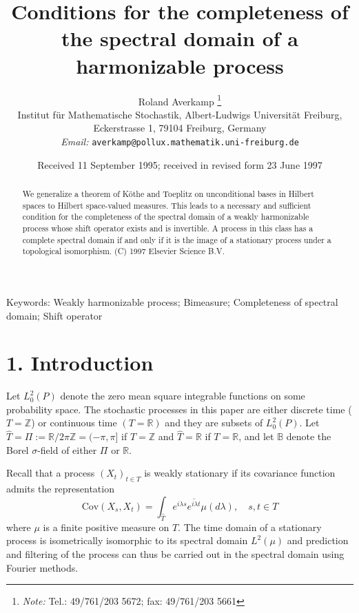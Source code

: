 \documentclass{article}
\newcommand{\assign}{:=}
\newcommand{\tmaffiliation}[1]{\\ #1}
\newcommand{\tmemail}[1]{\\ \textit{Email:} \texttt{#1}}
\newcommand{\tmnote}[1]{\thanks{\textit{Note:} #1}}
\begin{document}
\title{Conditions for the completeness of the spectral domain of a
harmonizable process}

\author{
  Roland Averkamp
  \tmnote{Tel.: 49/761/203 5672; fax: 49/761/203 5661}
  \tmaffiliation{Institut f{\"u}r Mathematische Stochastik, Albert-Ludwigs
  Universit{\"a}t Freiburg, Eckerstrasse 1, 79104 Freiburg, Germany}
  \tmemail{averkamp@pollux.mathematik.uni-freiburg.de}
}

\date{Received 11 September 1995; received in revised form 23 June 1997}

\maketitle

\begin{abstract}
  We generalize a theorem of K{\"o}the and Toeplitz on unconditional bases in
  Hilbert spaces to Hilbert space-valued measures. This leads to a necessary
  and sufficient condition for the completeness of the spectral domain of a
  weakly harmonizable process whose shift operator exists and is invertible. A
  process in this class has a complete spectral domain if and only if it is
  the image of a stationary process under a topological isomorphism. (C) 1997
  Elsevier Science B.V.
\end{abstract}

{\noindent}Keywords: Weakly harmonizable process; Bimeasure; Completeness of
spectral domain; Shift operator

\section*{1. Introduction}

Let $L_0^2 (P)$ denote the zero mean square integrable functions on some
probability space. The stochastic processes in this paper are either discrete
time ($T =\mathbb{Z}$) or continuous time $(T =\mathbb{R})$ and they are
subsets of $L_0^2 (P)$. Let $\hat{T} = \Pi \assign \mathbb{R}/ 2 \pi
\mathbb{Z}= (- \pi, \pi]$ if $T =\mathbb{Z}$ and $\hat{T} =\mathbb{R}$ if $T
=\mathbb{R}$, and let $\mathbb{B}$ denote the Borel $\sigma$-field of either
$\Pi$ or $\mathbb{R}$.

Recall that a process $(X_t)_{t \in T}$ is weakly stationary if its covariance
function admits the representation
\begin{equation}
  \mathrm{Cov} (X_s, X_t) = \int_{\hat{T}} e^{i \lambda s} \overline{e^{i
  \lambda t}} \mu (d \lambda), \quad s, t \in T
\end{equation}
where $\mu$ is a finite positive measure on $\hat{T}$. The time domain of a
stationary process is isometrically isomorphic to its spectral domain $L^2
(\mu)$ and prediction and filtering of the process can thus be carried out in
the spectral domain using Fourier methods.
\end{document}
